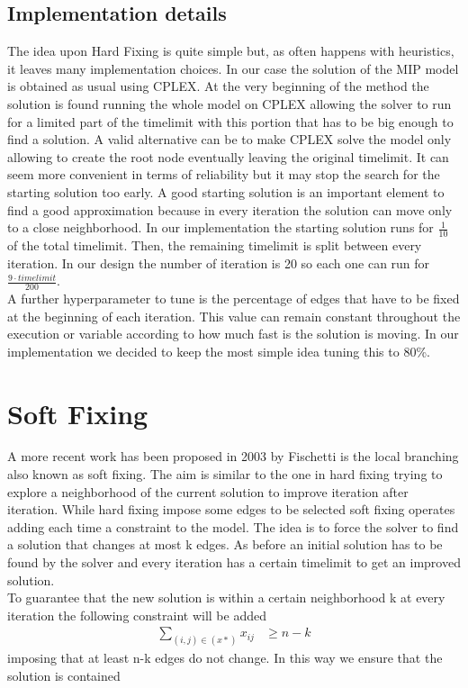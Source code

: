 \subsection{Implementation details}
The idea upon Hard Fixing is quite simple but, as often happens with heuristics, it leaves many implementation choices. In our case the solution of the MIP model is obtained as usual using CPLEX. At the very beginning of the method the solution is found running the whole model on CPLEX allowing the solver to run for a limited part of the timelimit with this portion that has to be big enough to find a solution. A valid alternative can be to make CPLEX solve the model only allowing to create the root node eventually leaving the original timelimit. It can seem more convenient in terms of reliability but it may stop the search for the starting solution too early. A good starting solution is an important element to find a good approximation because in every iteration the solution can move only to a close neighborhood. In our implementation the starting solution runs for $\frac{1}{10}$ of the total timelimit. Then, the remaining timelimit is split between every iteration. In our design the number of iteration is 20 so each one can run for $\frac{9\cdot timelimit}{200}$. \\
A further hyperparameter to tune is the percentage of edges that have to be fixed at the beginning of each iteration. This value can remain constant throughout the execution or variable according to how much fast is the solution is moving. In our implementation we decided to keep the most simple idea tuning this to 80\%.

\section{Soft Fixing}
A more recent work has been proposed in 2003 by Fischetti \cite{fischetti2003local} is the local branching also known as soft fixing. The aim is similar to the one in hard fixing trying to explore a neighborhood of the current solution to improve iteration after iteration. While hard fixing impose some edges to be selected soft fixing operates adding each time a constraint to the model. The idea is to force the solver to find a solution that changes at most k edges. As before an initial solution has to be found by the solver and every iteration has a certain timelimit to get an improved solution. \\
To guarantee that the new solution is within a certain neighborhood k at every iteration the following constraint will be added \\
\begin{equation*} 
    \begin{array}{rrlr} 
        \displaystyle\sum_{(i,j) \in (x*)} x_{ij} & \ge n-k 
    \end{array} 
\end{equation*}
imposing that at least n-k edges do not change. In this way we ensure that the solution is contained

